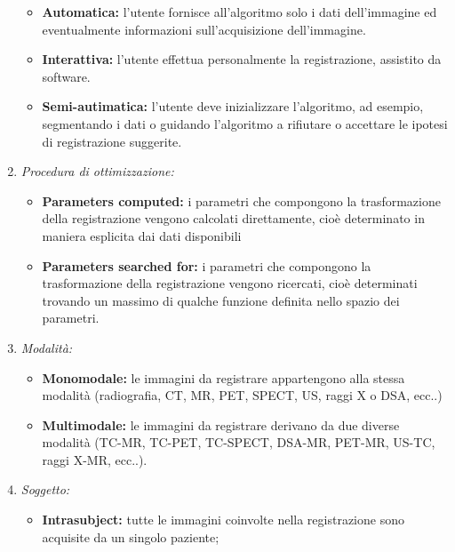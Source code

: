 \begin{enumerate}
          \begin{itemize}
              \item \textbf{Automatica:} l'utente fornisce all'algoritmo solo i dati
                    dell'immagine ed eventualmente informazioni sull'acquisizione
                    dell'immagine.
              \item \textbf{Interattiva:} l'utente effettua personalmente la registrazione,
                    assistito da software.
              \item \textbf{Semi-autimatica:} l'utente deve inizializzare l'algoritmo, ad esempio, segmentando i dati o guidando l'algoritmo a rifiutare
                    o accettare le ipotesi di registrazione suggerite.
          \end{itemize}

    \item \textit{Procedura di ottimizzazione:}
          \begin{itemize}
              \item \textbf{Parameters computed:} i parametri che compongono la trasformazione della registrazione vengono calcolati direttamente, cioè determinato in maniera esplicita dai dati
                    disponibili
              \item \textbf{Parameters searched for:} i parametri che compongono la trasformazione della registrazione vengono ricercati, cioè
                    determinati trovando un massimo di qualche funzione definita nello spazio dei parametri.
          \end{itemize}
    \item \textit{Modalità:}
          \begin{itemize}
              \item \textbf{Monomodale:} le immagini da registrare appartengono alla
                    stessa modalità (radiografia, CT, MR, PET, SPECT, US,
                    raggi X o DSA, ecc..)
              \item \textbf{Multimodale:} le immagini da registrare derivano da due
                    diverse modalità (TC-MR, TC-PET, TC-SPECT, DSA-MR,
                    PET-MR, US-TC, raggi X-MR, ecc..).
          \end{itemize}
    \item \textit{Soggetto:}
          \begin{itemize}
              \item \textbf{Intrasubject:} tutte le immagini coinvolte nella registrazione
                    sono acquisite da un singolo paziente;

\end{itemize}
\end{enumerate}
